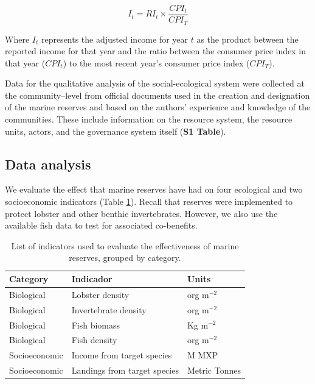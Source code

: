 \documentclass{frontiersSCNS}
\begin{document}
\begin{equation}
I_t = RI_t\times\frac{CPI_t}{CPI_T}
\label{eqn:cpi}
\end{equation}

Where \(I_t\) represents the adjusted income for year \(t\) as the
product between the reported income for that year and the ratio between
the consumer price index in that year (\(CPI_t\)) to the most recent
year's consumer price index (\(CPI_T\)).

Data for the qualitative analysis of the social-ecological system were
collected at the community--level from official documents used in the
creation and designation of the marine reserves
\citep{dof_website_2012,dof_website_2013,dof_website_2018} and based on
the authors' experience and knowledge of the communities. These include
information on the resource system, the resource units, actors, and the
governance system itself (\textbf{S1 Table}).

\subsection{Data analysis}\label{data-analysis}

We evaluate the effect that marine reserves have had on four ecological
and two socioeconomic indicators (Table \ref{table:indicators}). Recall
that reserves were implemented to protect lobster and other benthic
invertebrates. However, we also use the available fish data to test for
associated co-benefits.

\begin{table}[H]

\caption{\label{tab:unnamed-chunk-3}\label{table:indicators}List of indicators used to evaluate the effectiveness of marine reserves, grouped by category.}
\centering
\begin{tabular}[t]{l|l|l}
\hline
Category & Indicador & Units\\
\hline
Biological & Lobster density & org $\mathrm{m}^{-2}$\\
\hline
Biological & Invertebrate density & org $\mathrm{m}^{-2}$\\
\hline
Biological & Fish biomass & Kg $\mathrm{m}^{-2}$\\
\hline
Biological & Fish density & org $\mathrm{m}^{-2}$\\
\hline
Socioeconomic & Income from target species & M MXP\\
\hline
Socioeconomic & Landings from target species & Metric Tonnes\\
\hline
\end{tabular}
\end{table}
\end{document}
